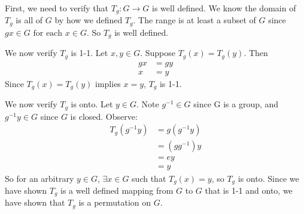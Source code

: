 \documentclass{article}
\begin{document}
First, we need to verify that $T_g \colon G \to G$ is well defined. We know the domain of $T_g$ is all of $G$ by how we defined $T_g$. The range is at least a subset of $G$ since $gx \in G \mbox{ for each }x \in G$. So $T_g$ is well defined.

We now verify $T_g$ is 1-1. Let $x,y \in G$. Suppose $T_g(x)=T_g(y)$. Then
\begin{align*}
 gx &= gy \\
 x &= y
\end{align*}
Since $T_g(x)=T_g(y)$ implies $x=y$, $T_g$ is 1-1.

We now verify $T_g$ is onto. Let $y \in G$. Note $g^{-1} \in G$ since G is a group, and $g^{-1}y \in G$ since $G$ is closed. Observe:
\begin{align*}
T_g(g^{-1}y)&=g(g^{-1}y) \\
&= (gg^{-1})y \\
&= ey \\
&= y
\end{align*}
So for an arbitrary $y \in G$, $\exists x \in G$ such that $T_g(x)=y$, so $T_g$ is onto. Since we have shown $T_g$ is a well defined mapping from $G$ to $G$ that is 1-1 and onto, we have shown that $T_g$ is a permutation on $G$.
\end{document}
